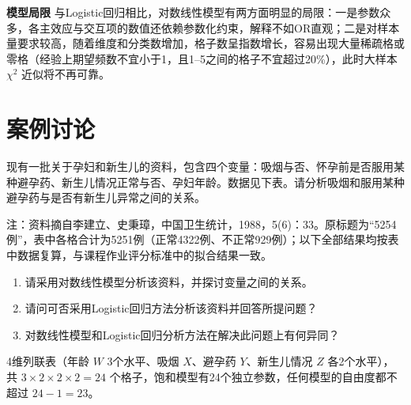 \textbf{模型局限} 与Logistic回归相比，对数线性模型有两方面明显的局限：一是参数众多，各主效应与交互项的数值还依赖参数化约束，解释不如OR直观；二是对样本量要求较高，随着维度和分类数增加，格子数呈指数增长，容易出现大量稀疏格或零格（经验上期望频数不宜小于1，且1--5之间的格子不宜超过20\%），此时大样本 $\chi^2$ 近似将不再可靠。
\section{案例讨论}
现有一批关于孕妇和新生儿的资料，包含四个变量：吸烟与否、怀孕前是否服用某种避孕药、新生儿情况正常与否、孕妇年龄。数据见下表。请分析吸烟和服用某种避孕药与是否有新生儿异常之间的关系。
\begin{center}\footnotesize 注：资料摘自李建立、史秉璋，中国卫生统计，1988，5(6)：33。原标题为“5254例”，表中各格合计为5251例（正常4322例、不正常929例）；以下全部结果均按表中数据复算，与课程作业评分标准中的拟合结果一致。\end{center}
\begin{enumerate}
\item 请采用对数线性模型分析该资料，并探讨变量之间的关系。
\item 请问可否采用Logistic回归方法分析该资料并回答所提问题？
\item 对数线性模型和Logistic回归分析方法在解决此问题上有何异同？
\end{enumerate}
4维列联表（年龄 $W$ 3个水平、吸烟 $X$、避孕药 $Y$、新生儿情况 $Z$ 各2个水平），共 $3\times2\times2\times2=24$ 个格子，饱和模型有24个独立参数，任何模型的自由度都不超过 $24-1=23$。
